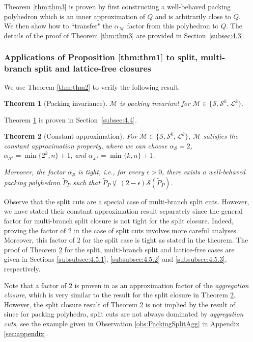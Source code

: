 \documentclass[11pt]{article}
\renewcommand{\S}{\mathcal{S}}
\renewcommand{\L}{\mathcal{L}}
\newcommand{\Mset}{M}
\newcommand{\M}{\mathcal{\Mset}}
\newtheorem{theorem}{Theorem}
\newcommand{\cred}{\color{black}}
\begin{document}
Theorem \ref{thm:thm3} is proven by first constructing a well-behaved packing polyhedron which is an inner approximation of $Q$ and is arbitrarily close to $Q$. We then show how to ``transfer" the $\alpha_\M$ factor from this polyhedron to $Q$. The details of the proof of Theorem \ref{thm:thm3} are provided in Section~\ref{subsec:4.3}. 

\subsubsection{Applications of Proposition \ref{thm:thm1} to split, multi-branch split and lattice-free closures}

We use Theorem \ref{thm:thm2} to verify the following result.

\begin{theorem}[Packing invariance]
\label{thm:thm4}
$\M$ is packing invariant for $\M \in \{ \S, \S^k, \L^k \}$.
\end{theorem}

Theorem \ref{thm:thm4} is proven in Section~\ref{subsec:4.4}.

\begin{theorem}[Constant approximation]
\label{thm:thm5}
For $\M \in \{ \S, \S^k, \L^k \}$, $\M$ satisfies the constant approximation property, where {\cred we can choose} $\alpha_{\S} = 2$, {\cred $\alpha_{\S^k} = \min \{ 2^k,n \}+1$, and $\alpha_{\L^k} = \min \{ k,n \}+1$}. 

Moreover, the factor $\alpha_{\S}$ is tight, i.e., for every $\epsilon >0$, there exists a well-behaved packing polyhedron $\tilde{P}_P$ such that $\tilde{P}_P \not\subseteq (2-\epsilon) \S(\tilde{P}_P)$. 
\end{theorem}

Observe that the split cuts are a special case of multi-branch split cuts. However, we have stated their constant approximation result separately since the general factor for multi-branch split closure is not tight for the split closure. Indeed, proving the factor of 2 in the case of split cuts involves more careful analyses. Moreover, this factor of 2 for the split case is tight as stated in the theorem. The proof of Theorem \ref{thm:thm5} for the split, multi-branch split and lattice-free cases are given in Sections \ref{subsubsec:4.5.1}, \ref{subsubsec:4.5.2} and \ref{subsubsec:4.5.3}, respectively.

Note that a factor of $2$ is proven in \cite{bodur2016aggregation} as an approximation factor of the \emph{aggregation closure}, which is very similar to the result {\cred for the} split closure in Theorem \ref{thm:thm5}. However, the split closure result of Theorem \ref{thm:thm5} is not implied by the result of \cite{bodur2016aggregation} since for packing polyhedra, split cuts are not {\cred always} dominated by \emph{aggregation cuts}, see the example given in Observation \ref{obs:PackingSplitAgg} in Appendix \ref{sec:appendix}.
\end{document}
